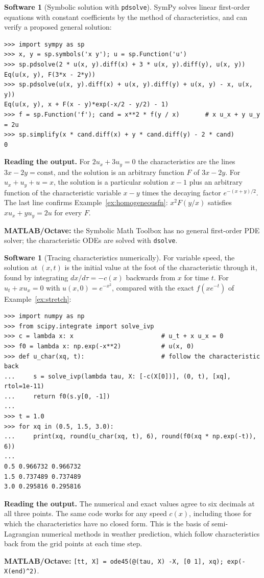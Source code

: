\documentclass[11pt,a4paper]{article}
\numberwithin{equation}{section}
\theoremstyle{definition}
\newtheorem{software}[thm]{Software}
\begin{document}
\begin{software}[Symbolic solution with \texttt{pdsolve}]
\label{sw:pdsolve}
SymPy solves linear first-order equations with constant coefficients by the method of characteristics, and can verify a proposed general solution:
{\small\begin{verbatim}
>>> import sympy as sp
>>> x, y = sp.symbols('x y'); u = sp.Function('u')
>>> sp.pdsolve(2 * u(x, y).diff(x) + 3 * u(x, y).diff(y), u(x, y))
Eq(u(x, y), F(3*x - 2*y))
>>> sp.pdsolve(u(x, y).diff(x) + u(x, y).diff(y) + u(x, y) - x, u(x, y))
Eq(u(x, y), x + F(x - y)*exp(-x/2 - y/2) - 1)
>>> f = sp.Function('f'); cand = x**2 * f(y / x)       # x u_x + y u_y = 2u
>>> sp.simplify(x * cand.diff(x) + y * cand.diff(y) - 2 * cand)
0
\end{verbatim}}
\textbf{Reading the output.} For $2u_x + 3u_y = 0$ the characteristics are the lines $3x - 2y = \text{const}$, and the solution is an arbitrary function $F$ of $3x - 2y$. For $u_x + u_y + u = x$, the solution is a particular solution $x - 1$
plus an arbitrary function of the characteristic variable $x - y$ times the decaying factor $e^{-(x + y)/2}$. The last line confirms Example~\ref{ex:homogeneousfn}: $x^2F(y/x)$ satisfies $xu_x + yu_y = 2u$ for every $F$.

\textbf{MATLAB/Octave:} the Symbolic Math Toolbox has no general first-order PDE solver; the characteristic ODEs are solved with \texttt{dsolve}.
\end{software}

\begin{software}[Tracing characteristics numerically]
\label{sw:traceback}
For variable speed, the solution at $(x, t)$ is the initial value at the foot of the characteristic through it, found by integrating $dx/d\tau = -c(x)$ backwards from $x$ for time $t$. For $u_t + xu_x = 0$ with
$u(x, 0) = e^{-x^2}$, compared with the exact $f(xe^{-t})$ of Example~\ref{ex:stretch}:
{\small\begin{verbatim}
>>> import numpy as np
>>> from scipy.integrate import solve_ivp
>>> c = lambda x: x                        # u_t + x u_x = 0
>>> f0 = lambda x: np.exp(-x**2)           # u(x, 0)
>>> def u_char(xq, t):                     # follow the characteristic back
...     s = solve_ivp(lambda tau, X: [-c(X[0])], (0, t), [xq], rtol=1e-11)
...     return f0(s.y[0, -1])
...
>>> t = 1.0
>>> for xq in (0.5, 1.5, 3.0):
...     print(xq, round(u_char(xq, t), 6), round(f0(xq * np.exp(-t)), 6))
...
0.5 0.966732 0.966732
1.5 0.737489 0.737489
3.0 0.295816 0.295816
\end{verbatim}}
\textbf{Reading the output.} The numerical and exact values agree to six decimals at all three points. The same code works for any speed $c(x)$, including those for which the characteristics have no
closed form. This is the basis of semi-Lagrangian numerical methods in weather prediction, which follow characteristics back from the grid points at each time step.

\textbf{MATLAB/Octave:} \texttt{[tt, X] = ode45(@(tau, X) -X, [0 1], xq); exp(-X(end)\^{}2)}.
\end{software}
\end{document}
